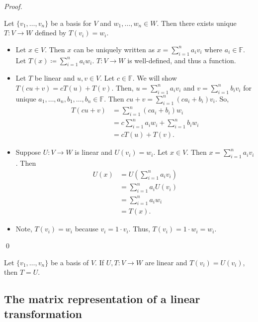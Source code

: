 \documentclass[12pt]{article}
\newenvironment{corollary}[2][Corollary]{\begin{trivlist}
\item[\hskip \labelsep {\bfseries #1}\hskip \labelsep {\bfseries #2}]}{\end{trivlist}}
\newenvironment{sol}
    {\emph{Proof.}
    }
    {
    \qed
    }
\begin{document}
\begin{sol}
Let $\{v_1, \dots, v_n\}$ be a basis for $V$ and $w_1, \dots, w_n \in W$. Then there exists unique $T : V \to W$ defined by $T(v_i) = w_i$.

\begin{itemize}
    \item[(1)] Let $x \in V$. Then $x$ can be uniquely written as $x = \sum_{i = 1}^na_iv_i$ where $a_i \in \mathbb{F}$. Let $T(x) \coloneqq \sum_{i = 1}^na_iw_i.$ $T: V \to W$ is well-defined, and thus a function.
    
    \item[(2)] Let $T$ be linear and $u, v \in V$. Let $c \in \mathbb{F}$. We will show $T(cu + v) = cT(u) + T(v)$. Then, $u = \sum_{i = 1}^na_iv_i$ and $v = \sum_{i = 1}^nb_iv_i$ for unique $a_1, \dots, a_n, b_1, \dots, b_n \in \mathbb{F}$. Then $cu + v = \sum_{i = 1}^n(ca_i + b_i)v_i$. So, 
    \begin{align*}
        T(cu + v) &= \sum_{i = 1}^n(ca_i + b_i)w_i \\
        &= c \sum_{i = 1}^na_iw_i + \sum_{i = 1}^nb_iw_i \\
        &= cT(u) + T(v).
    \end{align*}
    
    \item[(3)] Suppose $U : V \to W$ is linear and $U(v_i) = w_i$. Let $x \in V$. Then $x = \sum_{i = 1}^na_iv_i$. Then 
    \begin{align*}
        U(x) &= U\left(\sum_{i = 1}^na_iv_i\right) \\
        &= \sum_{i = 1}^na_iU(v_i) \\
        &= \sum_{i = 1}^na_iw_i \\
        &= T(x).
    \end{align*}
    
    \item[(4)] Note, $T(v_i) = w_i$ because $v_i = 1 \cdot v_i$. Thus, $T(v_i) = 1 \cdot w_i = w_i$.
    
\end{itemize}
\end{sol}

\begin{corollary}{7}
Let $\{v_1, \dots, v_n\}$ be a basis of $V$. If $U,T : V \to W$ are linear and $T(v_i) = U(v_i)$, then $T = U$.
\end{corollary}

\subsection{The matrix representation of a linear transformation}
\end{document}
